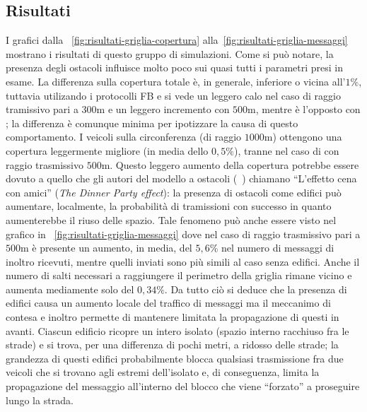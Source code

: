 \subsection{Risultati}\label{sec:configurazione-griglia-risultati}
I grafici dalla \figurename~\ref{fig:risultati-griglia-copertura} alla~\ref{fig:risultati-griglia-messaggi}\footnotemark
{}
mostrano i risultati di questo gruppo di simulazioni.
Come si può notare, la presenza degli ostacoli influisce molto poco sui quasi tutti i parametri presi in esame.
La differenza sulla copertura totale è, in generale, inferiore o vicina all'$1\%$, tuttavia utilizando i protocolli FB e \statica{} si vede
un leggero calo nel caso di raggio tramissivo pari a $300$m e un leggero incremento con $500$m, mentre
è l'opposto con \staticb{}; la differenza è comunque minima per ipotizzare la causa di questo comportamento. %
I veicoli sulla circonferenza (di raggio $1000$m) ottengono una copertura leggermente migliore
(in media dello $0,5\%$), tranne nel caso di \staticb{} con raggio trasmissivo $500$m.
Questo leggero aumento della copertura potrebbe essere dovuto a quello che gli autori del modello a ostacoli (~\cite{Carpenter:2015:OMI:2756509.2756512})
chiamano ``L'effetto cena con amici'' (\textit{The Dinner Party effect}): la presenza di ostacoli come edifici
può aumentare, localmente, la probabilità di tramissioni con successo in quanto aumenterebbe il riuso delle spazio.
Tale fenomeno può anche essere visto nel grafico in \figurename~\ref{fig:risultati-griglia-messaggi}
dove nel caso di raggio trasmissivo pari a $500$m è presente un aumento, in media, del $5,6$\%
nel numero di messaggi di inoltro ricevuti, mentre quelli inviati sono più simili al caso senza edifici.
Anche il numero di salti necessari a raggiungere il perimetro della griglia rimane vicino
e aumenta mediamente solo del $0,34\%$.
Da tutto ciò si deduce che la presenza di edifici causa un aumento locale del traffico di messaggi
ma il meccanimo di contesa e inoltro permette di mantenere limitata la propagazione di questi in avanti. %
Ciascun edificio ricopre un intero isolato (spazio interno racchiuso fra le strade) e si trova, per una differenza di pochi metri,
a ridosso delle strade;
la grandezza di questi edifici probabilmente blocca qualsiasi trasmissione fra due veicoli che si trovano
agli estremi dell'isolato e, di conseguenza, limita la propagazione del messaggio all'interno del blocco  che viene ``forzato''
a proseguire lungo la strada.
